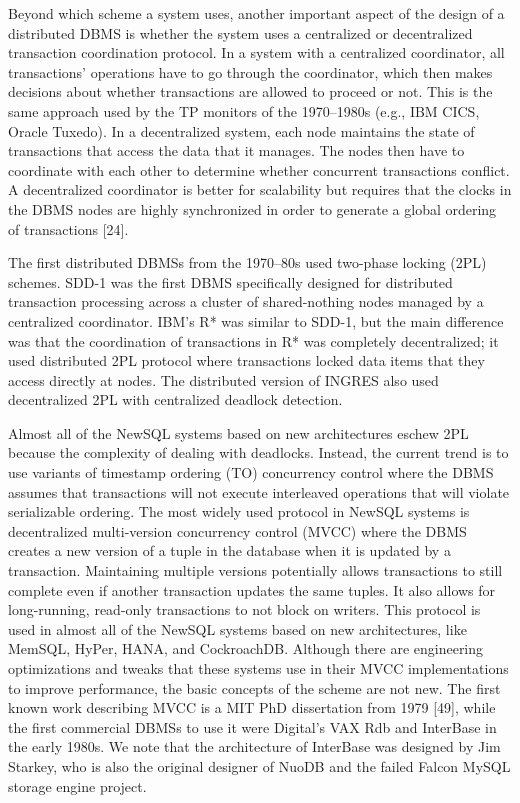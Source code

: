 \documentclass[a4paper,11pt,twoside,openright]{article}
\begin{document}
Beyond which scheme a system uses, another important aspect of the
design of a distributed DBMS is whether the system uses a centralized or
decentralized transaction coordination protocol. In a system with a
centralized coordinator, all transactions' operations have to go through
the coordinator, which then makes decisions about whether transactions
are allowed to proceed or not. This is the same approach used by the TP
monitors of the 1970--1980s (e.g., IBM CICS, Oracle Tuxedo). In a
decentralized system, each node maintains the state of transactions that
access the data that it manages. The nodes then have to coordinate with
each other to determine whether concurrent transactions conflict. A
decentralized coordinator is better for scalability but requires that
the clocks in the DBMS nodes are highly synchronized in order to
generate a global ordering of transactions {[}24{]}.

The first distributed DBMSs from the 1970--80s used two-phase locking
(2PL) schemes. SDD-1 was the first DBMS specifically designed for
distributed transaction processing across a cluster of shared-nothing
nodes managed by a centralized coordinator. IBM's R* was similar to
SDD-1, but the main difference was that the coordination of transactions
in R* was completely decentralized; it used distributed 2PL protocol
where transactions locked data items that they access directly at nodes.
The distributed version of INGRES also used decentralized 2PL with
centralized deadlock detection.

Almost all of the NewSQL systems based on new architectures eschew 2PL
because the complexity of dealing with deadlocks. Instead, the current
trend is to use variants of timestamp ordering (TO) concurrency control
where the DBMS assumes that transactions will not execute interleaved
operations that will violate serializable ordering. The most widely used
protocol in NewSQL systems is decentralized multi-version concurrency
control (MVCC) where the DBMS creates a new version of a tuple in the
database when it is updated by a transaction. Maintaining multiple
versions potentially allows transactions to still complete even if
another transaction updates the same tuples. It also allows for
long-running, read-only transactions to not block on writers. This
protocol is used in almost all of the NewSQL systems based on new
architectures, like MemSQL, HyPer, HANA, and CockroachDB. Although there
are engineering optimizations and tweaks that these systems use in their
MVCC implementations to improve performance, the basic concepts of the
scheme are not new. The first known work describing MVCC is a MIT PhD
dissertation from 1979 {[}49{]}, while the first commercial DBMSs to use
it were Digital's VAX Rdb and InterBase in the early 1980s. We note that
the architecture of InterBase was designed by Jim Starkey, who is also
the original designer of NuoDB and the failed Falcon MySQL storage
engine project.
\end{document}

